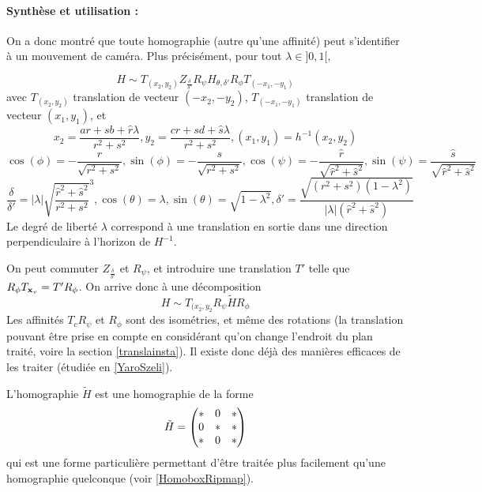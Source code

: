 \paragraph{Synthèse et utilisation :}
  On a donc montré que toute homographie (autre qu'une affinité) peut s'identifier à un mouvement de caméra. Plus précisément, pour tout $\lambda \in ]0,1[$,

  \begin{equation*}
H \sim T_{(x_2,y_2)} Z_{\frac{\delta}{\delta'}}  R_{\psi}  H_{\theta,\delta'} R_{\phi}  T_{(-x_1,-y_1)}
  \end{equation*}
  avec $T_{(x_2,y_2)}$ translation de vecteur $(-x_2,-y_2)$, $T_{(-x_1,-y_1)}$ translation de vecteur $(x_1,y_1)$, et
 \begin{equation*}
x_2=\frac{ar+sb+\hat r \lambda}{r^2 +s^2}, y_2=\frac{cr+sd+\hat s \lambda}{r^2 +s^2}, (x_1 , y_1) = h^{-1}(x_{2},y_{2})
  \end{equation*}
 \begin{equation*}
 \cos( \phi )= - \frac{r}{\sqrt{r^2 + s^2}}, \sin( \phi )= - \frac{s}{\sqrt{r^2 + s^2}},\cos( \psi ) =- \frac{\hat r}{\sqrt{\hat r^2 + \hat s^2}}, \sin( \psi ) = \frac{\hat s}{\sqrt{\hat r^2 + \hat s^2}}
 \end{equation*}
 \begin{equation*}
 \frac{\delta}{\delta'}=|\lambda|\sqrt{\frac{\hat r^2 + \hat s^2}{r^2 + s^2}}^{3}, \cos(\theta)=\lambda, \sin(\theta)=\sqrt{1-\lambda^2}, \delta'=  \frac{\sqrt{(r^2 + s^2)(1-\lambda^2)}}{|\lambda| (\hat r^2+\hat s^2)}
 \end{equation*}
 Le degré de liberté $\lambda$ correspond à une translation en sortie dans une direction perpendiculaire à l'horizon de $H^{-1}$.
 
 On peut commuter $Z_{\frac{\delta}{\delta'}}$ et $R_{\psi}$, et introduire une translation $T'$ telle que $R_{\phi}  T_{\mathbf{x}_{v}} = T' R_\phi$. On arrive donc à une décomposition
   \begin{equation}
H \sim T_{(x_2,y_2} R_{\psi}  \tilde H R_{\phi}
 \label{formule_decomposition_effective}
  \end{equation}
  Les affinités $T_{c} R_{\psi}$ et $R_{\phi}$ sont des isométries, et même des rotations (la translation pouvant être prise en compte en considérant qu'on change l'endroit du plan traité, voire la section \ref{translainsta}). Il existe donc déjà des manières efficaces de les traiter (étudiée en \ref{YaroSzeli}).
  
  L'homographie $\tilde H$ est une homographie de la forme
  \[\tilde H = \begin{pmatrix} *&0&*\\ 0&*&*\\ *&0&* \end{pmatrix}\]
  qui est une forme particulière permettant d'être traitée plus facilement qu'une homographie quelconque (voir \ref{HomoboxRipmap}).
  
